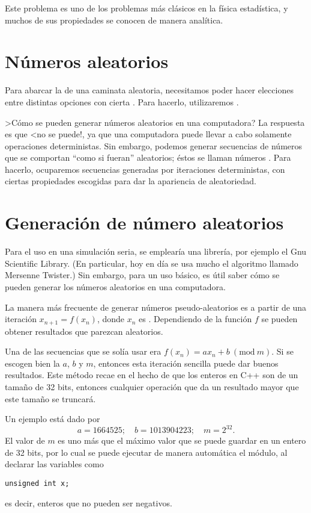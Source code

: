 Este problema es uno de los problemas más clásicos en la física estadística, y
muchos de sus propiedades se conocen de manera analítica.

\section{Números aleatorios}

Para abarcar la  de una caminata aleatoria, necesitamos poder
hacer elecciones entre distintas opciones con cierta .
Para hacerlo, utilizaremos .

>Cómo se pueden generar números aleatorios en una computadora? La respuesta es
que <no se puede!, ya que una computadora puede llevar a cabo solamente
operaciones deterministas. Sin embargo, podemos generar secuencias de números
que se comportan ``como si fueran'' aleatorios; éstos se llaman números
. Para hacerlo, ocuparemos secuencias generadas por
iteraciones deterministas, con ciertas propiedades escogidas para dar la
apariencia de aleatoriedad.

\section{Generación de número aleatorios}

Para el uso en una simulación seria, se emplearía una librería, por ejemplo el
Gnu Scientific Library. (En
particular, hoy en día se usa mucho el algoritmo llamado Mersenne Twister.)
Sin embargo, para un uso básico, es útil saber cómo se pueden generar los
números
aleatorios en una computadora.

La manera más frecuente de generar números pseudo-aleatorios es a partir de una
iteración $x_{n+1} = f(x_n)$, donde $x_n$ es . Dependiendo de la
función $f$ se pueden obtener resultados que parezcan aleatorios.

Una de las secuencias que se solía usar era $f(x_n) = ax_n + b\ (\mathrm{mod\ }
m)$. Si se escogen bien la $a$, $b$ y $m$,  entonces esta iteración sencilla
puede dar buenos resultados. Este método recae en el hecho de que los enteros
en C++ son de un tamaño de 32 bits, entonces cualquier operación que da un
resultado mayor que este tamaño se truncará.

Un ejemplo está dado por
\begin{equation}
 a = 1664525; \quad b=1013904223; \quad m=2^{32}.
\end{equation}
El valor de $m$ es uno más que el máximo valor que se puede guardar en un
entero de 32 bits, por lo cual se puede ejecutar de manera automática el
módulo, al declarar las variables como 
\begin{lstlisting}
unsigned int x;
\end{lstlisting}
es decir, enteros que no pueden ser negativos.

